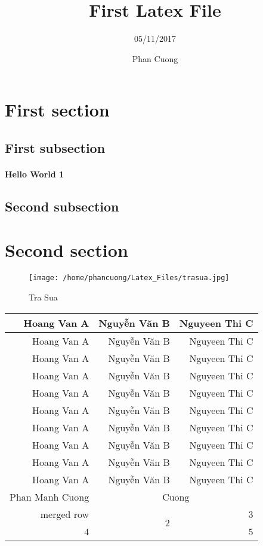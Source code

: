 \documentclass[a4paper,13pt]{article}
\begin{document}
\title{First Latex File}
\author{05/11/2017}
\date{Phan Cuong}
\maketitle
\section{First section}
\subsection{First subsection}
\paragraph{Hello World 1}
\subsection{Second subsection}
\section{Second section}
\begin{figure}[h]
\centering
\texttt{[image: /home/phancuong/Latex\_Files/trasua.jpg]}
\caption{Tra Sua}
\label{}
\end{figure}
\begin{longtable}{|r|r|r|}
\hline
Hoang Van A&Nguyễn Văn B&Nguyeen Thi C\\
\hline
Hoang Van A&Nguyễn Văn B&Nguyeen Thi C\\
\hline
Hoang Van A&Nguyễn Văn B&Nguyeen Thi C\\
\hline
Hoang Van A&Nguyễn Văn B&Nguyeen Thi C\\
\hline
Hoang Van A&Nguyễn Văn B&Nguyeen Thi C\\
\hline
Hoang Van A&Nguyễn Văn B&Nguyeen Thi C\\
\hline
Hoang Van A&Nguyễn Văn B&Nguyeen Thi C\\
\hline
Hoang Van A&Nguyễn Văn B&Nguyeen Thi C\\
\hline
Hoang Van A&Nguyễn Văn B&Nguyeen Thi C\\
\hline
Hoang Van A&Nguyễn Văn B&Nguyeen Thi C\\
\hline
Phan Manh Cuong&\multicolumn{2}{|c|}{Cuong }\\
\hline
merged row&\multirow{2}{*}{2}&3\\
\hhline{-}
\hhline{-~-}
4& &5\\
\hline
\end{longtable}
\end{document}
